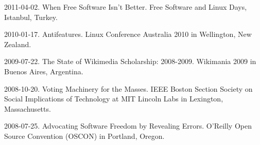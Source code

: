 \documentclass[10pt]{article}
\newenvironment{cvlist}{
\begin{list}{}{\leftmargin=3.0em \itemindent=-3.0em}
  \setlength{\itemsep}{0pt}
  \setlength{\parskip}{0em}
  \setlength{\parsep}{1em}
  \setlength{\parindent}{0em}}
{\vspace{1em}
\end{list}}
\begin{document}
\begin{cvlist}
\item 2011-04-02. When Free Software Isn't Better. Free Software and Linux Days, Istanbul, Turkey.
\item 2010-01-17. Antifeatures. Linux Conference Australia 2010 in Wellington, New Zealand. %
\item 2009-07-22. The State of Wikimedia Scholarship: 2008-2009. Wikimania 2009 in Buenos Aires, Argentina.
\item 2008-10-20. Voting Machinery for the Masses. IEEE Boston Section Society on Social Implications of Technology at MIT Lincoln Labs in Lexington, Massachusetts.
\item 2008-07-25. Advocating Software Freedom by Revealing Errors. O'Reilly Open Source Convention (OSCON) in Portland, Oregon. %

\end{cvlist}
\end{document}
